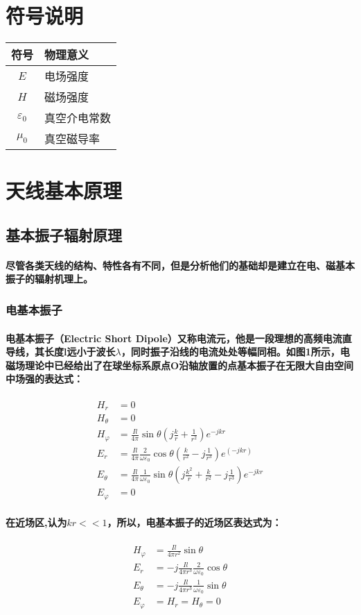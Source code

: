 \documentclass[UTF8]{ctexart}
\begin{document}
\section{符号说明}
\begin{tabular}{cp{24em}}
\hline
符号 & 物理意义 \\
	\hline
	$E$ & 电场强度 \\
	$H$ & 磁场强度 \\
	$\varepsilon_0$ & 真空介电常数 \\
	$\mu_0$ & 真空磁导率 \\
	\hline
\end{tabular}
\newpage
\section{天线基本原理}
\subsection{基本振子辐射原理}
\paragraph{尽管各类天线的结构、特性各有不同，但是分析他们的基础却是建立在电、磁基本振子的辐射机理上。}
\subsubsection{电基本振子}
\paragraph{电基本振子（Electric Short Dipole）又称电流元，他是一段理想的高频电流直导线，其长度l远小于波长$\lambda$，同时振子沿线的电流处处等幅同相。如图1所示，电磁场理论中已经给出了在球坐标系原点O沿轴放置的点基本振子在无限大自由空间中场强的表达式：}
\begin{align}
H_{r} & = 0 \\ H_{\theta} & = 0 \\ H_{\varphi} & = \frac{Il}{4\pi}\sin \theta(j\frac{k}{r}+\frac{1}{r^2})e^{-jkr}\\
E_{r} & = \frac{Il}{4\pi}\frac{2}{\omega \varepsilon_{0}}\cos \theta(\frac{k}{r^2}-j\frac{1}{r^3})e^(-jkr)\\
E_{\theta} & = \frac{Il}{4\pi}\frac{1}{\omega \varepsilon_{0}}\sin \theta(j\frac{k^2}{r}+\frac{k}{r^2}-j\frac{1}{r^3})e^{-jkr} \\
E_{\varphi} & = 0
\end{align}
\paragraph{在近场区,认为$kr<<1$，所以，电基本振子的近场区表达式为：}
\begin{align}
H_{\varphi} & = \frac{Il}{4\pi r^2}\sin \theta \\ E_r & = -j\frac{Il}{4\pi r^3}\frac{2}{\omega \varepsilon_0} \cos \theta \\ E_{\theta} & = -j\frac{Il}{4\pi r^3}\frac{1}{\omega \varepsilon_0}\sin \theta \\
E_{\varphi} & = H_r = H_{\theta} = 0
\end{align}
\end{document}
